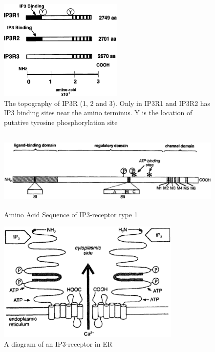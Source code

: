 \begin{figure}[hbt]
 \centerline{\includegraphics[height=5cm]{./images/IP3R_topography.eps}}
 \caption{The topography of IP3R (1, 2 and 3). Only in IP3R1 and IP3R2
   has IP3 binding sites near the amino terminus. Y is the location of
 putative tyrosine phosphorylation site}
 \label{fig:IP3R_topo}
\end{figure}


\begin{figure}[htb]
  \centerline{\includegraphics[height=4cm]{./images/IP3-receptor_sequence.eps}}
  \caption{Amino Acid Sequence of IP3-receptor type 1}\label{fig:IP3-receptor_seq}
\end{figure}

\begin{figure}[htb]
  \centerline{\includegraphics[height=6cm]{./images/IP3-receptor_subunit_pore.eps}}
  \caption{A diagram of an IP3-receptor in ER}
  \label{fig:IP3-receptor_pore}
\end{figure}



